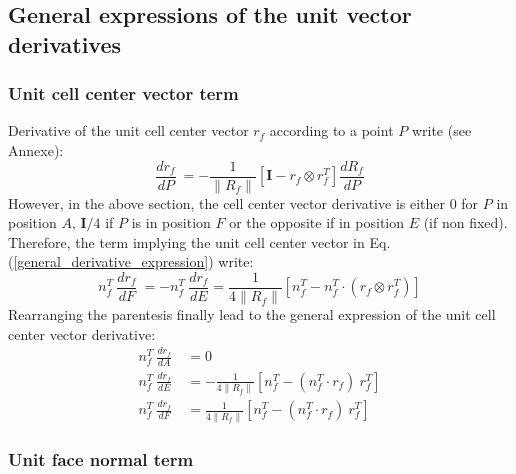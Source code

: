 \documentclass[11pt]{article}
\begin{document}
\subsection{General expressions of the unit vector derivatives}

\subsubsection{Unit cell center vector term}

Derivative of the unit cell center vector $r_f$ according to a point $P$ write (see Annexe):
\begin{equation}
\frac{d r_f}{dP}\ = 
- \frac{1}{\| R_f \|} \left[ \boldsymbol{I} - r_f \otimes r_f^T \right] \frac{d R_f}{dP}
\end{equation}
However, in the above section, the cell center vector derivative is either 0 for $P$ in position $A$, $\boldsymbol{I} /4$ if $P$ is in position $F$ or the opposite if in position $E$ (if non fixed). 
Therefore, the term implying the unit cell center vector in Eq. (\ref{general_derivative_expression}) write:
\begin{equation}
n_f^T\ \frac{d r_f}{dF}\ = - n_f^T\ \frac{d r_f}{dE} =
 \frac{1}{4 \| R_f \|} \left[n_f^T- n_f^T \cdot (r_f \otimes r_f^T) \right]
\end{equation}
Rearranging the parentesis finally lead to the general expression of the unit cell center vector derivative:
\begin{subequations}
\begin{align}
n_f^T\ \frac{d r_f}{dA}\ &=  0 \\
n_f^T\ \frac{d r_f}{dE}\ &= - \frac{1}{4 \| R_f \|} \left[ n_f^T - (n_f^T \cdot r_f)\ r_f^T \right] \\
n_f^T\ \frac{d r_f}{dF}\ &=  \frac{1}{4 \| R_f \|} \left[ n_f^T - (n_f^T \cdot r_f)\  r_f^T \right]
\end{align}
\end{subequations} 


\subsubsection{Unit face normal term}
\end{document}
